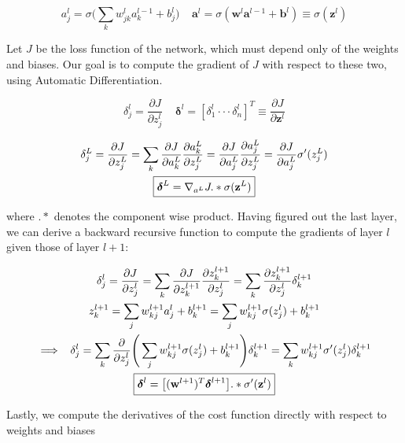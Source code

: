 \documentclass{article}
\numberwithin{equation}{subsection}
\begin{document}
\begin{equation*}
    a_j^l = \sigma\Big( \sum_k w_{jk}^l a_k^{l-1} + b_j^l \Big) \;\;\;\; \textbf{a}^l = \sigma(\textbf{w}^l \textbf{a}^{l-1} + \textbf{b}^l) \equiv \sigma(\textbf{z}^l)
\end{equation*}

Let $J$ be the loss function of the network, which must depend only of the weights and biases. Our goal is to compute the gradient of $J$ with respect to these two, using Automatic Differentiation.

\begin{equation*}
    \delta_j^l = \frac{\partial J}{\partial z_j^l} \;\;\;\; \boldsymbol{\delta}^l = [\delta^l_1 \cdot\cdot\cdot \delta^l_n]^T \equiv \frac{\partial J}{\partial \textbf{z}^l}
\end{equation*}

\begin{gather}
    \delta_j^L = \frac{\partial J}{\partial z_j^L} = \sum_{k} \frac{\partial J}{\partial a_k^L} \frac{\partial a^L_k}{\partial z_j^L} = \frac{\partial J}{\partial a^L_j}\frac{\partial a^L_j}{\partial z_j^L} = \frac{\partial J}{\partial a_j^L} \sigma'(z_j^L) \notag \\
    \boxed{
    \boldsymbol{\delta}^L = \nabla_{a^L} J .* \sigma(\textbf{z}^L)
    }
\end{gather}

where $.*$ denotes the component wise product. Having figured out the last layer, we can derive a backward recursive function to compute the gradients of layer $l$ given those of layer $l+1$:

\begin{gather}
    \delta_j^l = \frac{\partial J}{\partial z_j^l} = \sum_k \frac{\partial J}{\partial z_k^{l+1}} \frac{\partial z^{l+1}_k}{\partial z^l_j} = \sum_k \frac{\partial z_k^{l+1}}{\partial z_j^l} \delta^{l+1}_k \notag  \\
    z^{l+1}_k = \sum_j w_{kj}^{l+1} a_j^l + b^{l+1}_k = \sum_j w_{kj}^{l+1} \sigma(z_j^l) + b_k^{l+1} \notag \\
    \implies \;\; \delta_j^l = \sum_k \frac{\partial}{\partial z_j^l} \Bigg( \sum_j w_{kj}^{l+1} \sigma(z_j^l) + b_k^{l+1} \Bigg) \delta_k^{l+1} = \sum_k w^{l+1}_{kj} \sigma'(z_j^l) \delta^{l+1}_k \notag \\
    \boxed{\boldsymbol{\delta}^l = \big[ (\textbf{w}^{l+1})^T \boldsymbol{\delta}^{l+1} \big] .* \sigma'(\textbf{z}^l)}
\end{gather}

Lastly, we compute the derivatives of the cost function directly with respect to weights and biases
\end{document}
